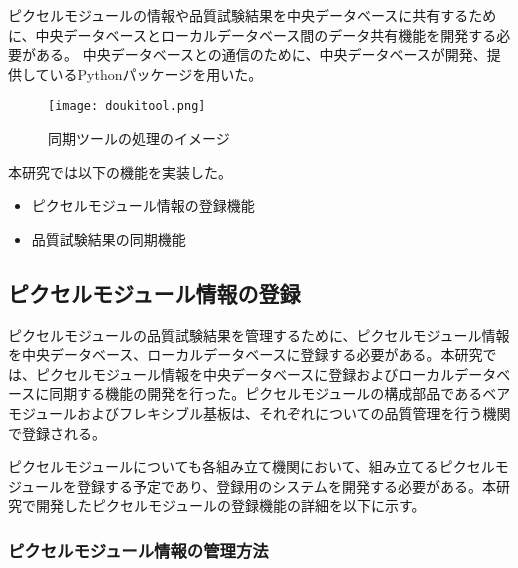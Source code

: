 ピクセルモジュールの情報や品質試験結果を中央データベースに共有するために、中央データベースとローカルデータベース間のデータ共有機能を開発する必要がある。
中央データベースとの通信のために、中央データベースが開発、提供しているPythonパッケージを用いた。

\begin{figure}[tbp]
  \centering
  \texttt{[image: doukitool.png]}
  \caption[同期ツールの処理のイメージ]{同期ツールの処理のイメージ}
  \label{fig:doukitool}
\end{figure}


本研究では以下の機能を実装した。
\begin{itemize}
  \item ピクセルモジュール情報の登録機能
  \item 品質試験結果の同期機能
\end{itemize}


\subsection{ピクセルモジュール情報の登録}
\label{sec:register-module}

ピクセルモジュールの品質試験結果を管理するために、ピクセルモジュール情報を中央データベース、ローカルデータベースに登録する必要がある。本研究では、ピクセルモジュール情報を中央データベースに登録およびローカルデータベースに同期する機能の開発を行った。ピクセルモジュールの構成部品であるベアモジュールおよびフレキシブル基板は、それぞれについての品質管理を行う機関で登録される。

ピクセルモジュールについても各組み立て機関において、組み立てるピクセルモジュールを登録する予定であり、登録用のシステムを開発する必要がある。本研究で開発したピクセルモジュールの登録機能の詳細を以下に示す。


\subsubsection{ピクセルモジュール情報の管理方法}
\label{sec:module-parentchild}

